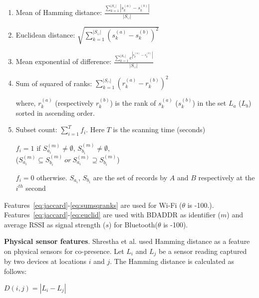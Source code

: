 {\begin{enumerate}
\item \label{eq:hamming}Mean of Hamming distance: $\frac{\sum\nolimits_{k=1}^{|S_{\cup}|} |s_k^{(a)} -
      s_k^{(b)}|}{|S_{\cup}|} $


\item \label{eq:euclid}Euclidean distance: $\sqrt{\sum\nolimits_{k=1}^{|S_{\cup}|} (s_k^{(a)} -
      s_k^{(b)})^{2}} $


\item \label{eq:expdif}Mean exponential of difference: $\frac{\sum\nolimits_{k=1}^{|S_{\cup}|} e^{|s_k^{(a)}
        - s_k^{(b)}|}}{|S_{\cup}|}$


\item \label{eq:sumsqranks}Sum of squared of ranks: $\sum\nolimits_{k=1}^{|S_{\cap}|} (r_k^{(a)}-r_k^{(b)})^2$



where,
$r_k^{(a)}$ (respectively $r_k^{(b)}$) is the rank of $s_k^{(a)}$
($s_k^{(b)}$) in the set $L_a$ ($L_b$) sorted in
ascending order.



\item \label{eq:subsetcnt} Subset count: $\sum\nolimits_{i=1}^{T} f_i$.
Here $T$ is the scanning time (seconds)

 $f_i=1$ if $S_{a_i}^{(m)} \ne \emptyset$, $ S_{b_i}^{(m)} \ne
 \emptyset$, \\\hspace*{1.4cm}($S^{(m)}_{a_i} \subseteq S_{b_i}^{(m)} ~or~ S^{(m)}_{a_i} \supseteq S_{b_i}^{(m)}$)

 $f_i=0$ otherwise. $S_{a_i}$, $S_{b_i}$ are the set of records by $A$
 and $B$ respectively at the $i^{th}$ second

\end{enumerate}





Features~\ref{eq:jaccard}-\ref{eq:sumsqranks} are used for Wi-Fi ($\theta$ is -100.). Features~\ref{eq:jaccard}-\ref{eq:euclid} are used with BDADDR as 
identifier ($m$) and average RSSI as signal strength ($s$) for Bluetooth($\theta$ is -100). 


\textbf{Physical sensor features}. Shrestha et al. \cite{ShresthaFC2014} used Hamming distance as a feature on physical sensors for co-presence. 
Let $L_i$ and $L_j$ be a sensor reading captured by two devices at
locations $i$ and $j$. The Hamming distance is calculated as follows:

\begin{center}
$D(i,j)=|L_i-L_j|$
\end{center}

}
